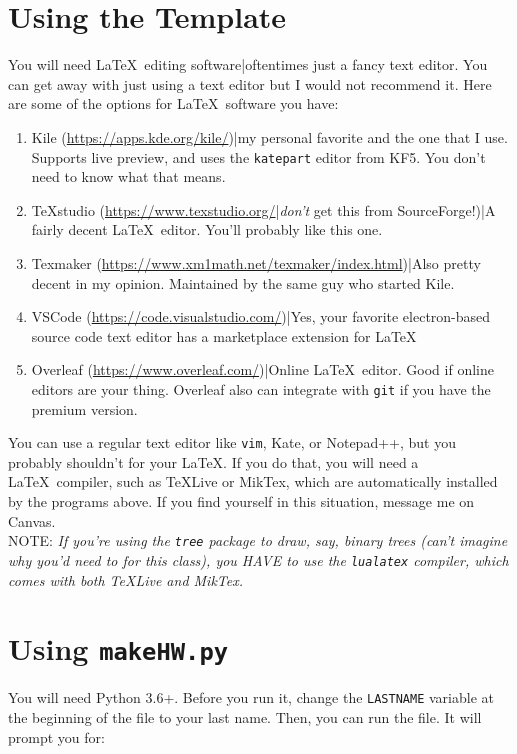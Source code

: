 \documentclass[a4paper,10pt]{article}
\begin{document}
\section{Using the Template}

You will need \LaTeX\ editing software|oftentimes just a fancy text editor. You can get away with just using a text editor but I would not recommend it. Here are some of the options for \LaTeX\ software you have:
\begin{enumerate}
	\item Kile (\url{https://apps.kde.org/kile/})|my personal favorite and the one that I use. Supports live preview, and uses the \texttt{katepart} editor from KF5. You don't need to know what that means.
	\item TeXstudio (\url{https://www.texstudio.org/}|\emph{don't} get this from SourceForge!)|A fairly decent \LaTeX\ editor. You'll probably like this one.
	\item Texmaker (\url{https://www.xm1math.net/texmaker/index.html})|Also pretty decent in my opinion. Maintained by the same guy who started Kile.
	\item VSCode (\url{https://code.visualstudio.com/})|Yes, your favorite electron-based source code text editor has a marketplace extension for \LaTeX\!
	\item Overleaf (\url{https://www.overleaf.com/})|Online \LaTeX\ editor. Good if online editors are your thing. Overleaf also can integrate with \texttt{git} if you have the premium version.
\end{enumerate}

\noindent You can use a regular text editor like \texttt{vim}, Kate, or Notepad++, but you probably shouldn't for your \LaTeX. If you do that, you will need a \LaTeX\ compiler, such as TeXLive or MikTex, which are automatically installed by the programs above. If you find yourself in this situation, message me on Canvas.
\\[10pt]
NOTE:\textit{
If you're using the \texttt{tree} package to draw, say, binary trees (can't imagine why you'd need to for this class), you HAVE to use the \texttt{lualatex} compiler, which comes with both TeXLive and MikTex.
}

\section{Using \texttt{makeHW.py}}

You will need Python 3.6+. Before you run it, change the \texttt{LASTNAME} variable at the beginning of the file to your last name. Then, you can run the file. It will prompt you for:
\end{document}
